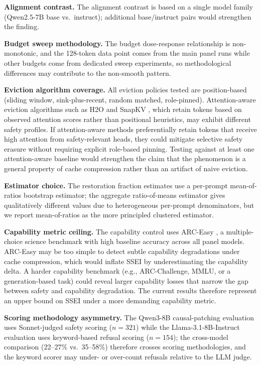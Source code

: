 \documentclass{article}
\begin{document}
\textbf{Alignment contrast.} The alignment contrast is based on a single model family (Qwen2.5-7B base vs.\ instruct); additional base/instruct pairs would strengthen the finding.

\textbf{Budget sweep methodology.} The budget dose-response relationship is non-monotonic, and the 128-token data point comes from the main panel runs while other budgets come from dedicated sweep experiments, so methodological differences may contribute to the non-smooth pattern.

\textbf{Eviction algorithm coverage.} All eviction policies tested are position-based (sliding window, sink-plus-recent, random matched, role-pinned). Attention-aware eviction algorithms such as H2O \citep{zhang2023h2o} and SnapKV \citep{li2024snapkv}, which retain tokens based on observed attention scores rather than positional heuristics, may exhibit different safety profiles. If attention-aware methods preferentially retain tokens that receive high attention from safety-relevant heads, they could mitigate selective safety erasure without requiring explicit role-based pinning. Testing against at least one attention-aware baseline would strengthen the claim that the phenomenon is a general property of cache compression rather than an artifact of naive eviction.

\textbf{Estimator choice.} The restoration fraction estimates use a per-prompt mean-of-ratios bootstrap estimator; the aggregate ratio-of-means estimator gives qualitatively different values due to heterogeneous per-prompt denominators, but we report mean-of-ratios as the more principled clustered estimator.

\textbf{Capability metric ceiling.} The capability control uses ARC-Easy \citep{clark2018arc}, a multiple-choice science benchmark with high baseline accuracy across all panel models. ARC-Easy may be too simple to detect subtle capability degradations under cache compression, which would inflate SSEI by underestimating the capability delta. A harder capability benchmark (e.g., ARC-Challenge, MMLU, or a generation-based task) could reveal larger capability losses that narrow the gap between safety and capability degradation. The current results therefore represent an upper bound on SSEI under a more demanding capability metric.

\textbf{Scoring methodology asymmetry.} The Qwen3-8B causal-patching evaluation uses Sonnet-judged safety scoring ($n = 321$) while the Llama-3.1-8B-Instruct evaluation uses keyword-based refusal scoring ($n = 154$); the cross-model comparison (22--27\% vs.\ 35--58\%) therefore crosses scoring methodologies, and the keyword scorer may under- or over-count refusals relative to the LLM judge.
\end{document}
